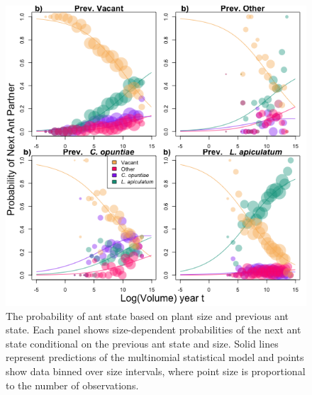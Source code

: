 \documentclass[11pt]{article}
\begin{document}
\begin{figure}[H]
	\includegraphics[width=0.95\linewidth]{Figures/transition.png}
	\caption{The probability of ant state based on plant size and previous ant state. Each panel shows size-dependent probabilities of the next ant state conditional on the previous ant state and size. Solid lines represent predictions of the multinomial statistical model and points show data binned over size intervals, where point size is proportional to the number of observations.}
	\label{fig:Ant_Transition}
\end{figure}
\end{document}
